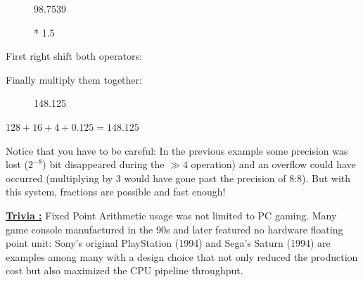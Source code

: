 \par
\begin{figure}[H]
 \centering
   
   \caption{98.7539} 
\end{figure} 
\par
\begin{figure}[H]
 \centering
   
   \caption{* 1.5} 
\end{figure} 
\par
First right shift both operators:\\
\par
\begin{figure}[H]
 \centering
   
\end{figure} 
\par
\begin{figure}[H]
 \centering
   
\end{figure} 
\par

Finally multiply them together:

\begin{figure}[H]
 \centering
   
   \caption{148.125} 
\end{figure} 
$128 + 16 + 4 + 0.125 = 148.125 $


Notice that you have to be careful: In the previous example some precision was lost ($ 2^{-8}$) bit disappeared during the $\gg 4$ operation) and an overflow could have occurred (multiplying by 3 would have gone past the precision of 8:8). But with this system, fractions are possible and fast enough!\\
\par
\begin{minipage}{\textwidth}
 
 \end{minipage}
\par
 \textbf{\underline{Trivia :}}  Fixed Point Arithmetic usage was not limited to PC gaming. Many game console manufactured in the 90s and later featured no hardware floating point unit: Sony's original PlayStation (1994) and Sega's Saturn (1994) are examples among many with a design choice that not only reduced the production cost but also maximized the CPU pipeline throughput.
 

 
 


